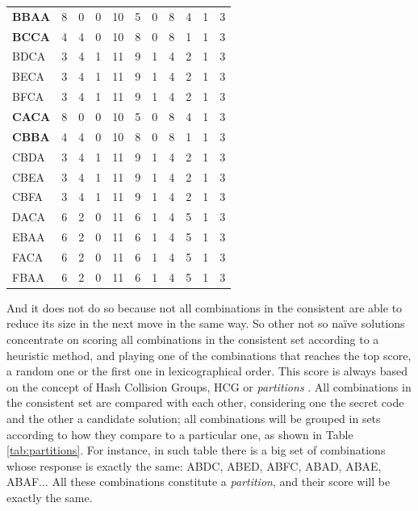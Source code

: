 \documentclass[preprint,12pt]{elsarticle}
\begin{document}
\begin{table}[htb!]
\begin{tabular}{|l|c|c|c|c|c|c|c|c|c|c|}
{\bf BBAA} &8 & 0 & 0 & 10 & 5 & 0 & 8 & 4 & 1 & 3 \\
{\bf BCCA} &4 & 4 & 0 & 10 & 8 & 0 & 8 & 1 & 1 & 3 \\
BDCA &3 & 4 & 1 & 11 & 9 & 1 & 4 & 2 & 1 & 3 \\
BECA &3 & 4 & 1 & 11 & 9 & 1 & 4 & 2 & 1 & 3 \\
BFCA &3 & 4 & 1 & 11 & 9 & 1 & 4 & 2 & 1 & 3 \\
{\bf CACA} &8 & 0 & 0 & 10 & 5 & 0 & 8 & 4 & 1 & 3 \\
{\bf CBBA} &4 & 4 & 0 & 10 & 8 & 0 & 8 & 1 & 1 & 3 \\
CBDA &3 & 4 & 1 & 11 & 9 & 1 & 4 & 2 & 1 & 3 \\
CBEA &3 & 4 & 1 & 11 & 9 & 1 & 4 & 2 & 1 & 3 \\
CBFA &3 & 4 & 1 & 11 & 9 & 1 & 4 & 2 & 1 & 3 \\
DACA &6 & 2 & 0 & 11 & 6 & 1 & 4 & 5 & 1 & 3 \\
EBAA &6 & 2 & 0 & 11 & 6 & 1 & 4 & 5 & 1 & 3 \\
FACA &6 & 2 & 0 & 11 & 6 & 1 & 4 & 5 & 1 & 3 \\
FBAA &6 & 2 & 0 & 11 & 6 & 1 & 4 & 5 & 1 & 3 \\
\hline
\end{tabular}
\end{table}

And it does not do so because not all combinations in the consistent
are able to reduce its size in the next move in the same way. So other
not so naïve solutions concentrate on scoring all combinations in the
consistent set according to a heuristic method, and playing one of the
combinations that reaches the top score, a random one or the first one
in lexicographical order. This score is always based on the concept of Hash
Collision Groups, HCG \cite{Chen2007435} or {\em partitions} \cite{Kooi200513}.  All
combinations in the consistent set are compared with each other,
considering one the secret code and the other a candidate solution;
all combinations will be grouped in sets according to how they compare
to a particular one, as shown in Table \ref{tab:partitions}. For
instance, in such table there is a big  set of combinations whose
response is exactly the same: ABDC, ABED, ABFC, ABAD, ABAE,
ABAF... All these combinations constitute a {\em partition}, and their
score will be exactly the same. 
\end{document}
